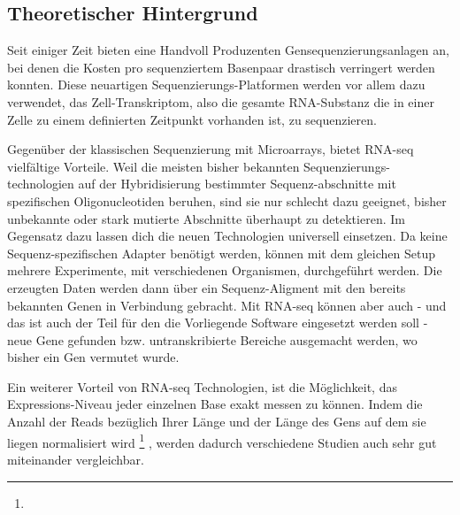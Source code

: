 \documentclass[a4paper]{thesis}
\begin{document}
\subsection{Theoretischer Hintergrund}

Seit einiger Zeit bieten eine Handvoll Produzenten Gensequenzierungsanlagen an,
bei denen die Kosten pro sequenziertem Basenpaar
drastisch verringert werden konnten. Diese neuartigen
Sequenzierungs-Platformen werden vor allem 
dazu verwendet, das Zell-Transkriptom, also die gesamte RNA-Substanz die
in einer Zelle zu einem definierten Zeitpunkt vorhanden ist, zu sequenzieren.

Gegenüber der klassischen Sequenzierung mit Microarrays, bietet RNA-seq
vielfältige Vorteile. Weil die meisten bisher bekannten Sequenzierungs-
technologien auf der Hybridisierung bestimmter Sequenz-abschnitte mit
spezifischen Oligonucleotiden beruhen, sind sie nur schlecht dazu geeignet,
bisher unbekannte oder stark mutierte Abschnitte überhaupt zu detektieren.
Im Gegensatz dazu lassen dich die neuen Technologien universell einsetzen. Da
keine Sequenz-spezifischen Adapter benötigt werden, können mit dem gleichen
Setup mehrere Experimente, mit verschiedenen Organismen, durchgeführt werden.
Die erzeugten Daten werden dann über ein Sequenz-Aligment mit den bereits
bekannten Genen in Verbindung gebracht. Mit RNA-seq können aber auch - und
das ist auch der Teil für den die Vorliegende Software eingesetzt werden
soll - neue Gene gefunden bzw. untranskribierte Bereiche
ausgemacht werden, wo bisher ein Gen vermutet wurde.
\cite{croucher_studying_2010}

\def\fnI{
	Third, whereas hybridization-based methods measure gene expression
	levels through detection of fluorescence or radioactivity, RNA-seq
	uses the amount of data matching a given coding sequence (CDS),
	typically quantified as reads per kilobase CDS length per million
	reads analyzed (RPKM) [4].
	\cite{croucher_studying_2010}
}

Ein weiterer Vorteil von RNA-seq Technologien, ist die Möglichkeit,
das Expressions-Niveau jeder einzelnen Base exakt messen zu können.
Indem die Anzahl der Reads bezüglich Ihrer Länge und der Länge des
Gens auf dem sie liegen normalisiert wird \footnote{\expandafter\fnI}
, werden
dadurch verschiedene Studien auch sehr gut miteinander vergleichbar.
\cite{croucher_studying_2010,wang_rna-seq:_2009}
\end{document}
